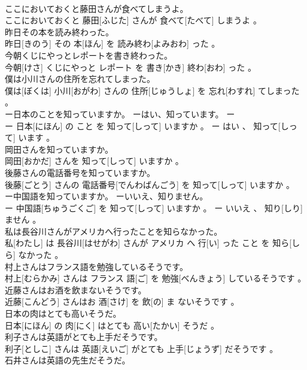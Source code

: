\documentclass[8pt]{extreport}
\begin{document}
\begin{CJK}{UTF8}{min}
\\	ここにおいておくと藤田さんが食べてしまうよ。	
\\	ここにおいておくと 藤田[ふじた] さんが 食べて[たべて] しまうよ 。
\\	昨日その本を読み終わった。	
\\	昨日[きのう] その 本[ほん] を 読み終わ[よみおわ] った 。
\\	今朝くじにやっとレポートを書き終わった。	
\\	今朝[けさ] くじにやっと レポート を 書き[かき] 終わ[おわ] った 。
\\	僕は小川さんの住所を忘れてしまった。	
\\	僕は[ぼくは] 小川[おがわ] さんの 住所[じゅうしょ] を 忘れ[わすれ] てしまった 。
\\	ー日本のことを知っていますか。 ーはい、知っています。	ー
\\	ー 日本[にほん] の こと を 知って[しって] いますか 。 ー はい 、 知って[しって] います 。
\\	岡田さんを知っていますか。	
\\	岡田[おかだ] さんを 知って[しって] いますか 。
\\	後藤さんの電話番号を知っていますか。	
\\	後藤[ごとう] さんの 電話番号[でんわばんごう] を 知って[しって] いますか 。
\\	ー中国語を知っていますか。 ーいいえ、知りません。	
\\	ー 中国語[ちゅうごくご] を 知って[しって] いますか 。 ー いいえ 、 知り[しり] ません 。
\\	私は長谷川さんがアメリカへ行ったことを知らなかった。	
\\	私[わたし] は 長谷川[はせがわ] さんが アメリカ へ 行[い] った こと を 知ら[しら] なかった 。
\\	村上さんはフランス語を勉強しているそうです。	
\\	村上[むらかみ] さんは フランス 語[ご] を 勉強[べんきょう] しているそうです 。
\\	近藤さんはお酒を飲まないそうです。	
\\	近藤[こんどう] さんはお 酒[さけ] を 飲[の] ま ないそうです 。
\\	日本の肉はとても高いそうだ。	
\\	日本[にほん] の 肉[にく] はとても 高い[たかい] そうだ 。
\\	利子さんは英語がとても上手だそうです。	
\\	利子[としこ] さんは 英語[えいご] がとても 上手[じょうず] だそうです 。
\\	石井さんは英語の先生だそうだ。	

\end{CJK}
\end{document}
